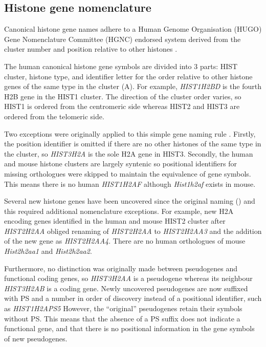 
  \subsection{Histone gene nomenclature}
    Canonical histone gene names adhere to a Human Genome Organisation (HUGO) Gene Nomenclature Committee (HGNC) 
	endorsed system derived from the cluster number and position relative to other histones \citep{Marzluff02}.

	The human canonical histone gene symbols are divided into 3 parts: 
	HIST cluster, histone type, and identifier letter
	for the order relative to other histone genes of the same type in the cluster (A).
	For example, \textit{HIST1H2BD} is the fourth H2B gene in the HIST1 cluster.
	The direction of the cluster order varies, so HIST1 is ordered from the centromeric side 
	whereas HIST2 and HIST3 are ordered from the telomeric side.
	
    Two exceptions were originally applied to this simple gene naming rule \citep{Marzluff02}. 
	Firstly, the position identifier is omitted if there are no other histones of the same type in the cluster, 
	so \textit{HIST3H2A} is the sole H2A gene in HIST3. 
	Secondly, the human and mouse histone clusters are largely syntenic 
	so positional identifiers for missing orthologues were skipped to maintain the equivalence of gene symbols.
	This means there is no human \textit{HIST1H2AF} although \textit{Hist1h2af} exists in mouse.

	Several new histone genes have been uncovered since the original naming () 
	and this required additional nomenclature exceptions.
	For example, new H2A encoding genes identified in the human and mouse HIST2 cluster after \textit{HIST2H2AA} 
	obliged renaming of \textit{HIST2H2AA} to \textit{HIST2H2AA3} and the addition of the new gene as \textit{HIST2H2AA4}. 
	There are no human orthologues of mouse \textit{Hist2h2aa1} and \textit{Hist2h2aa2}.
	
	Furthermore, no distinction was originally made between pseudogenes and functional coding genes, 
	so \textit{HIST3H2AA} is a pseudogene whereas its neighbour \textit{HIST3H2AB} is a coding gene.
	Newly uncovered pseudogenes are now suffixed with PS and a number in order of discovery 
	instead of a positional identifier, such as \textit{HIST1H2APS5} 
	However, the ``original'' pseudogenes retain their symbols without PS. 
	This means that the absence of a PS suffix does not indicate a functional gene, 
	and that there is no positional information in the gene symbols of new pseudogenes.

